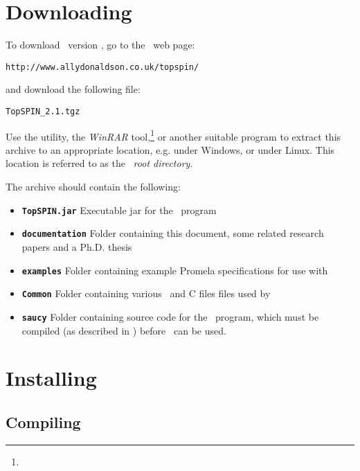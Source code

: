 \section{Downloading}\label{sec:downloadandinstall:downloading}

To download \topspin\ version \topspinversion, go to the \topspin\
web page:
%
\begin{lstlisting}
http://www.allydonaldson.co.uk/topspin/
\end{lstlisting}
%
and download the following file:
%
\begin{lstlisting}
TopSPIN_2.1.tgz
\end{lstlisting}
%
Use the  utility, the \emph{WinRAR}
tool,\footnote{\texttt{\winrarwebsite}} or another suitable program
to extract this archive to an appropriate location, e.g.
 under Windows, or
 under Linux.  This location is
referred to as the \topspin\ \emph{root directory}.

The archive should contain the following:

\begin{itemize}
\item {\bf \texttt{TopSPIN.jar} } Executable jar for the \topspin\ program
\item {\bf \texttt{documentation} } Folder containing this document, some related research papers
and a Ph.D. thesis
\item {\bf \texttt{examples} } Folder containing example Promela specifications for use with \topspin
\item {\bf \texttt{Common} } Folder containing various \gap\ and C files files used by \topspin
\item {\bf \texttt{saucy} } Folder containing source code for the \saucy\ program, which must be
compiled (as described in
) before
\topspin\ can be used.
\end{itemize}

\section{Installing}\label{sec:downloadandinstall:installation}

\subsection{Compiling \saucy}\label{sec:downloadandinstall:installation:compilingsaucy}


